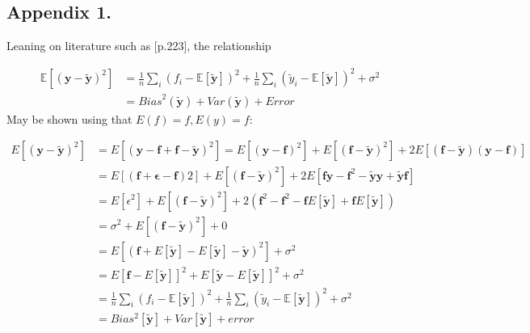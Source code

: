 \documentclass[%
oneside,                 %
final,                   %
10pt]{article}
\begin{document}
\begin{appendices}
\section*{Appendix 1.} \label{APP_1}
Leaning on literature such as \citep{HastieTrevor2009TEoS}[p.223], the relationship

\begin{align*}
\mathbb{E}\left[(\bm{y}-\bm{\tilde{y}})^2\right]&=\frac{1}{n}\sum_i(f_i-\mathbb{E}\left[\bm{\tilde{y}}\right])^2+\frac{1}{n}\sum_i(\tilde{y}_i-\mathbb{E}\left[\bm{\tilde{y}}\right])^2+\sigma^2 \\
&=\mathit{Bias}^2(\bm{\tilde{y}})+\mathit{Var}(\bm{\tilde{y}})+Error
\end{align*}
May be shown using that $E(f)=f, E(y)=f$:

\begin{align*}
E[(\bm{y}−\tilde{\bm{y}})^2]
&=E[(\bm{y}−\bm{f}+\bm{f}−\tilde{\bm{y}})^2]=E[(\bm{y}−\bm{f})^2]+E[(\bm{f}−\tilde{\bm{y}})^2]+2E[(\bm{f}−\tilde{\bm{y}})(\bm{y}−\bm{f})]\\
&=E[(\bm{f}+\bm{\epsilon}−\bm{f})2]+E[(\bm{f}−\tilde{\bm{y}})^2]+2E[\bm{f}\bm{y}−\bm{f}^2−\tilde{\bm{y}}\bm{y}+\tilde{\bm{y}}\bm{f}]\\
&=E[\epsilon^2]+E[(\bm{f}−\tilde{\bm{y}})^2]+2(\bm{f}^2−\bm{f}^2−\bm{f}E[\tilde{\bm{y}}]+\bm{f}E[\tilde{\bm{y}}])\\
&=\sigma^2+E[(\bm{f}−\tilde{\bm{y}})^2]+0\\
&=E[(\bm{f}+E[\tilde{\bm{y}}]−E[\tilde{\bm{y}}]−\tilde{\bm{y}})^2] + \sigma^2\\
&=E[\bm{f}−E[\tilde{\bm{y}}]]^2+E[\tilde{\bm{y}}−E[\tilde{\bm{y}}]]^2 + \sigma^2\\
&=\frac{1}{n}\sum_i(f_i-\mathbb{E}\left[\bm{\tilde{y}}\right])^2+\frac{1}{n}\sum_i(\tilde{y}_i-\mathbb{E}\left[\bm{\tilde{y}}\right])^2+\sigma^2 \\
&=Bias^2[\tilde{\bm{y}}]+Var[\tilde{\bm{y}}] + error
\end{align*}


\end{appendices}
\end{document}
